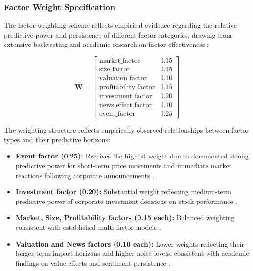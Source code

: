 \documentclass[3p,times,procedia]{elsarticle}
\begin{document}
\subsubsection{{Factor Weight Specification}}

The factor weighting scheme reflects empirical evidence regarding the relative predictive power and persistence of different factor categories, drawing from extensive backtesting and academic research on factor effectiveness \cite{Carhart1997,Harvey2016}:

\begin{equation}
\textbf{W} = 
\begin{bmatrix} 
\text{market\_factor} & 0.15 \\ 
\text{size\_factor} & 0.15 \\ 
\text{valuation\_factor} & 0.10 \\ 
\text{profitability\_factor} & 0.15 \\ 
\text{investment\_factor} & 0.20 \\ 
\text{news\_effect\_factor} & 0.10 \\ 
\text{event\_factor} & 0.25
\end{bmatrix}
\end{equation}

The weighting structure reflects empirically observed relationships between factor types and their predictive horizons:

\begin{itemize}
    \item \textbf{Event factor (0.25):} Receives the highest weight due to documented strong predictive power for short-term price movements and immediate market reactions following corporate announcements \cite{Ding2015,Daniel1998}.
    
    \item \textbf{Investment factor (0.20):} Substantial weight reflecting medium-term predictive power of corporate investment decisions on stock performance \cite{Daniel1998}.
    
    \item \textbf{Market, Size, Profitability factors (0.15 each):} Balanced weighting consistent with established multi-factor models \cite{FAMA1993,Carhart1997}.
    
    \item \textbf{Valuation and News factors (0.10 each):} Lower weights reflecting their longer-term impact horizons and higher noise levels, consistent with academic findings on value effects and sentiment persistence \cite{Rosenberg1985,TETLOCK2007}.
\end{itemize}
\end{document}
